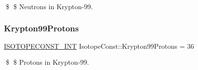 \$ \$ Neutrons in Krypton-\/99. \mbox{\label{group___isotope_const-_krypton-_kr99_ga222a4a115d66c7426312b34d7e9c68e7}} 
\subsubsection{\texorpdfstring{Krypton99\+Protons}{Krypton99Protons}}
{\footnotesize\ttfamily \mbox{\hyperlink{group___isotope_const-_macros_ga5f18360b3e99483a35c32d789e62621c}{I\+S\+O\+T\+O\+P\+E\+C\+O\+N\+S\+T\+\_\+\+I\+NT}} Isotope\+Const\+::\+Krypton99\+Protons = 36}

\$ \$ Protons in Krypton-\/99. 